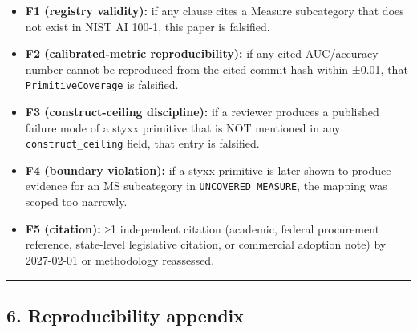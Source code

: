 \documentclass[
]{article}
\providecommand{\tightlist}{%
  \setlength{\itemsep}{0pt}\setlength{\parskip}{0pt}}
\begin{document}
\begin{itemize}
\tightlist
\item
  \textbf{F1 (registry validity):} if any clause cites a Measure
  subcategory that does not exist in NIST AI 100-1, this paper is
  falsified.
\item
  \textbf{F2 (calibrated-metric reproducibility):} if any cited
  AUC/accuracy number cannot be reproduced from the cited commit hash
  within ±0.01, that \texttt{PrimitiveCoverage} is falsified.
\item
  \textbf{F3 (construct-ceiling discipline):} if a reviewer produces a
  published failure mode of a styxx primitive that is NOT mentioned in
  any \texttt{construct\_ceiling} field, that entry is falsified.
\item
  \textbf{F4 (boundary violation):} if a styxx primitive is later shown
  to produce evidence for an MS subcategory in
  \texttt{UNCOVERED\_MEASURE}, the mapping was scoped too narrowly.
\item
  \textbf{F5 (citation):} ≥1 independent citation (academic, federal
  procurement reference, state-level legislative citation, or commercial
  adoption note) by 2027-02-01 or methodology reassessed.
\end{itemize}

\begin{center}\rule{0.5\linewidth}{0.5pt}\end{center}

\subsection{6. Reproducibility appendix}\label{reproducibility-appendix}
\end{document}
